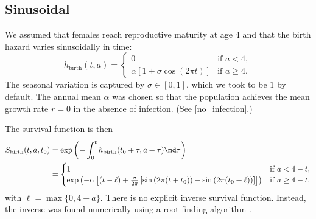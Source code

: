 \documentclass{jpmarticle}
\begin{document}
\subsection{Sinusoidal}

We assumed that females reach reproductive maturity at age $4$ and
that the birth hazard varies sinusoidally in time:
\begin{equation}
  h_{\text{birth}}(t, a) =
  \begin{cases}
    0 & \text{if $a < 4$},
    \\
    \alpha \left[1
      + \sigma \cos\left(2 \pi t\right)\right]
    & \text{if $a \geq 4$}.
  \end{cases}
\end{equation}
The seasonal variation is captured by $\sigma \in [0, 1]$, which we
took to be $1$ by default.  The annual mean $\alpha$ was chosen so
that the population achieves the mean growth rate $r = 0$ in the
absence of infection.  (See \autoref{no_infection}.)

The survival function is then
\begin{equation}
  \begin{split}
    S_{\text{birth}}(t, a, t_0) &=
    \exp\left(- \int_0^t h_{\text{birth}}(t_0 + \tau, a + \tau) \md
      \tau\right)
    \\
    &=
    \begin{cases}
      1 & \text{if $a < 4 - t$},
      \\
      \exp\left(- \alpha \left[
          (t - \ell)
          + \frac{\sigma}{2 \pi}
          \left[\sin\left(2 \pi (t + t_0)\right)
            - \sin\left(2 \pi (t_0 + \ell)\right)\right]
        \right]
      \right)
      & \text{if $a \geq 4 - t$},
    \end{cases}
  \end{split}
\end{equation}
with $\ell = \max\{0, 4 - a\}$.  There is no explicit inverse survival
function.  Instead, the inverse was found numerically using a
root-finding algorithm \citep{scipy}.





\end{document}
